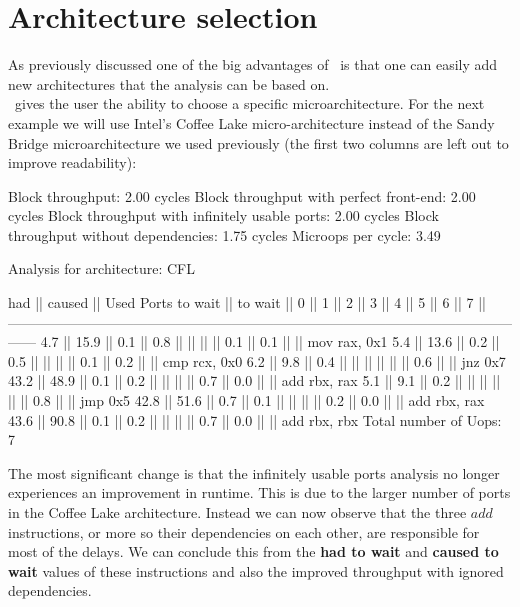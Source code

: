 \FloatBarrier

\section{Architecture selection}

As previously discussed one of the big advantages of \suaca\ is that one can easily add new architectures that the analysis can be based on.\\
\suaca\ gives the user the ability to choose a specific microarchitecture. For the next example we will use Intel's Coffee Lake micro-architecture instead of the Sandy Bridge microarchitecture we used previously (the first two columns are left out to improve readability):\\

\begin{example}
Block throughput: 2.00 cycles
Block throughput with perfect front-end: 2.00 cycles
Block throughput with infinitely usable ports: 2.00 cycles
Block throughput without dependencies: 1.75 cycles
Microops per cycle: 3.49

Analysis for architecture: CFL

   had   || caused  ||            Used Ports
 to wait || to wait ||   0   ||   1   ||   2   ||   3   ||   4   ||   5   ||   6   ||   7   ||
------------------------------------------------------------------------------------------------------------------
   4.7   ||  15.9   ||  0.1  ||  0.8  ||       ||       ||       ||  0.1  ||  0.1  ||       || mov rax, 0x1
   5.4   ||  13.6   ||  0.2  ||  0.5  ||       ||       ||       ||  0.1  ||  0.2  ||       || cmp rcx, 0x0
   6.2   ||   9.8   ||  0.4  ||       ||       ||       ||       ||       ||  0.6  ||       || jnz 0x7
  43.2   ||  48.9   ||  0.1  ||  0.2  ||       ||       ||       ||  0.7  ||  0.0  ||       || add rbx, rax
   5.1   ||   9.1   ||  0.2  ||       ||       ||       ||       ||       ||  0.8  ||       || jmp 0x5
  42.8   ||  51.6   ||  0.7  ||  0.1  ||       ||       ||       ||  0.2  ||  0.0  ||       || add rbx, rax
  43.6   ||  90.8   ||  0.1  ||  0.2  ||       ||       ||       ||  0.7  ||  0.0  ||       || add rbx, rbx
Total number of Uops: 7
\end{example}

The most significant change is that the infinitely usable ports analysis no longer experiences an improvement in runtime. This is due to the larger number of ports in the Coffee Lake architecture. Instead we can now observe that the three $add$ instructions, or more so their dependencies on each other, are responsible for most of the delays. We can conclude this from the \textbf{had to wait} and \textbf{caused to wait} values of these instructions and also the improved throughput with ignored dependencies.




